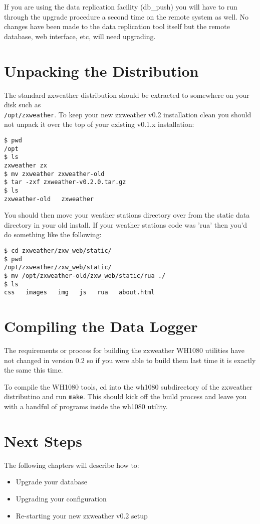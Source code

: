\documentclass[a4paper,10pt,draft]{book}
\begin{document}
If you are using the data replication facility (db\_push) you will have to run through the upgrade procedure a second time on the remote system as well. No changes have been made to the data replication tool itself but the remote database, web interface, etc, will need upgrading.

\section{Unpacking the Distribution}
The standard zxweather distribution should be extracted to somewhere on your disk such as \\ \verb|/opt/zxweather|. To keep your new zxweather v0.2 installation clean you should not unpack it over the top of your existing v0.1.x installation:

\begin{verbatim}
$ pwd
/opt
$ ls
zxweather zx
$ mv zxweather zxweather-old
$ tar -zxf zxweather-v0.2.0.tar.gz
$ ls
zxweather-old   zxweather
\end{verbatim}

You should then move your weather stations directory over from the static data directory in your old install. If your weather stations code was 'rua' then you'd do something like the following:
\begin{verbatim}
$ cd zxweather/zxw_web/static/
$ pwd
/opt/zxweather/zxw_web/static/
$ mv /opt/zxweather-old/zxw_web/static/rua ./
$ ls
css   images   img   js   rua   about.html
\end{verbatim}

\section{Compiling the Data Logger}
The requirements or process for building the zxweather WH1080 utilities have not changed in version 0.2 so if you were able to build them last time it is exactly the same this time.

To compile the WH1080 tools, cd into the wh1080 subdirectory of the zxweather distributino and run \verb|make|. This should kick off the build process and leave you with a handful of programs inside the wh1080 utility.

\section{Next Steps}
The following chapters will describe how to:
\begin{itemize}
\item Upgrade your database
\item Upgrading your configuration
\item Re-starting your new zxweather v0.2 setup
\end{itemize}
\end{document}
